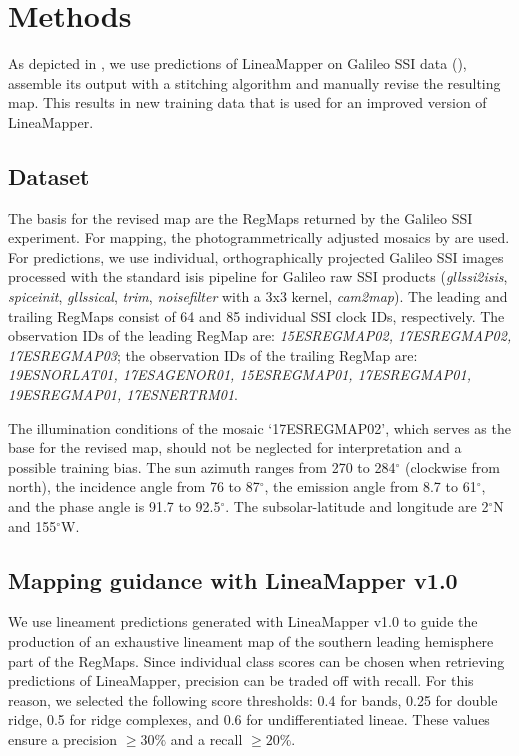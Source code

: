 \section{Methods}
As depicted in , we use predictions of LineaMapper on Galileo SSI data (), assemble its output with a stitching algorithm and manually revise the resulting map. This results in new training data that is used for an improved version of LineaMapper.

\subsection{Dataset}\label{sec:dataset}
The basis for the revised map are the RegMaps returned by the Galileo SSI experiment. For mapping, the photogrammetrically adjusted mosaics by are used. For predictions, we use individual, orthographically projected Galileo SSI images processed with the standard isis pipeline for Galileo raw SSI products (\textit{gllssi2isis}, \textit{spiceinit}, \textit{gllssical}, \textit{trim}, \textit{noisefilter} with a 3x3 kernel, \textit{cam2map}). The leading and trailing RegMaps consist of 64 and 85 individual SSI clock IDs, respectively. The observation IDs of the leading RegMap are: \textit{15ESREGMAP02, 17ESREGMAP02, 17ESREGMAP03}; the observation IDs of the trailing RegMap are: \textit{19ESNORLAT01, 17ESAGENOR01, 15ESREGMAP01, 17ESREGMAP01, 19ESREGMAP01, 17ESNERTRM01}.


The illumination conditions of the mosaic `17ESREGMAP02', which serves as the base for the revised map, should not be neglected for interpretation and a possible training bias. The sun azimuth ranges from 270 to 284$^{\circ}$ (clockwise from north), the incidence angle from 76 to 87$^{\circ}$, the emission angle from 8.7 to 61$^{\circ}$, and the phase angle is 91.7 to 92.5$^{\circ}$. The subsolar-latitude and longitude are 2$^{\circ}$N and 155$^{\circ}$W. 


\subsection{Mapping guidance with LineaMapper v1.0}\label{sec:mapping_guidance}
We use lineament predictions generated with LineaMapper v1.0 to guide the production of an exhaustive lineament map of the southern leading hemisphere part of the RegMaps. Since individual class scores can be chosen when retrieving predictions of LineaMapper, precision can be traded off with recall. For this reason, we selected the following score thresholds: 0.4 for bands, 0.25 for double ridge, 0.5 for ridge complexes, and 0.6 for undifferentiated lineae. These values ensure a precision $\geq 30\%$ and a recall $\geq 20\%$.

